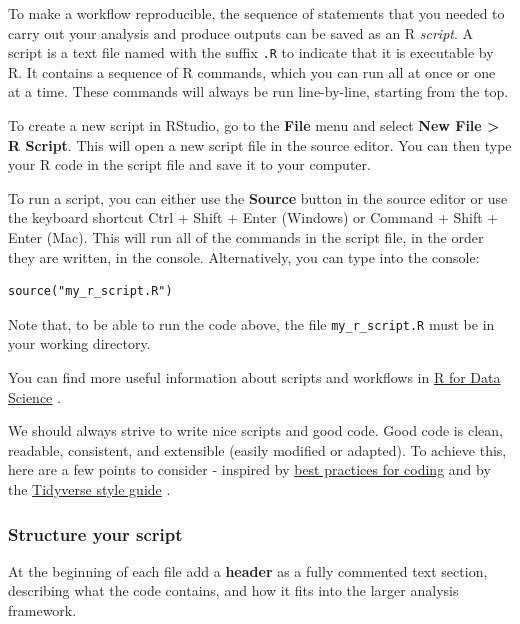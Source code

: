\documentclass[
]{book}
\begin{document}
To make a workflow reproducible, the sequence of statements that you needed to carry out your analysis and produce outputs can be saved as an R \emph{script}. A script is a text file named with the suffix \texttt{.R} to indicate that it is executable by R. It contains a sequence of R commands, which you can run all at once or one at a time. These commands will always be run line-by-line, starting from the top.

To create a new script in RStudio, go to the \textbf{File} menu and select \textbf{New File \textgreater{} R Script}. This will open a new script file in the source editor. You can then type your R code in the script file and save it to your computer.

To run a script, you can either use the \textbf{Source} button in the source editor or use the keyboard shortcut Ctrl + Shift + Enter (Windows) or Command + Shift + Enter (Mac). This will run all of the commands in the script file, in the order they are written, in the console. Alternatively, you can type into the console:

\begin{verbatim}
source("my_r_script.R")
\end{verbatim}

Note that, to be able to run the code above, the file \texttt{my\_r\_script.R} must be in your working directory.

You can find more useful information about scripts and workflows in \href{https://r4ds.had.co.nz/workflow-scripts.html}{R for Data Science} \citep{Wickham2017R}.

We should always strive to write nice scripts and good code. Good code is clean, readable, consistent, and extensible (easily modified or adapted). To achieve this, here are a few points to consider - inspired by \href{https://www.r-bloggers.com/r-code-best-practices/}{best practices for coding} and by the \href{https://style.tidyverse.org/}{Tidyverse style guide} \citep{wickham_welcome_nodate}.

\hypertarget{structure-your-script}{%
\subsubsection{Structure your script}\label{structure-your-script}}

At the beginning of each file add a \textbf{header} as a fully commented text section, describing what the code contains, and how it fits into the larger analysis framework.
\end{document}
